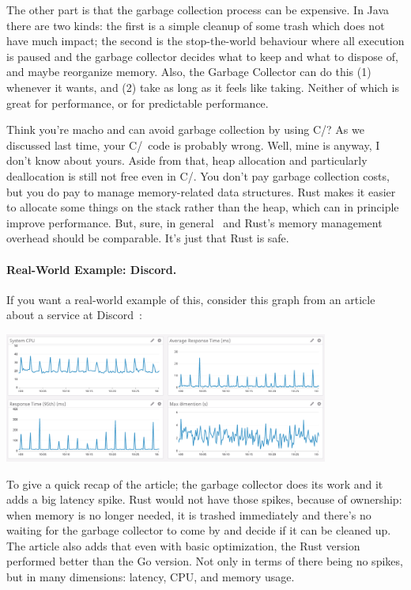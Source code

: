 The other part is that the garbage collection process can be expensive. In Java there are two kinds: the first is a simple cleanup of some trash which does not have much impact; the second is the stop-the-world behaviour where all execution is paused and the garbage collector decides what to keep and what to dispose of, and maybe reorganize memory.  Also, the Garbage Collector can do this (1) whenever it wants, and (2) take as long as it feels like taking. Neither of which is great for performance, or for predictable performance.

Think you're macho and can avoid garbage collection by using C/\CPP? As we discussed last time, your C/\CPP~code is probably wrong. Well, mine is anyway, I don't know about yours. Aside from that, heap allocation and particularly deallocation is still not free even in C/\CPP. You don't pay garbage collection costs, but you do pay to manage memory-related data structures. Rust makes it easier to allocate some things on the stack rather than the heap, which can in principle improve performance. But, sure, in general \CPP~and Rust's memory management overhead should be comparable. It's just that Rust is safe.

\paragraph{Real-World Example: Discord.} If you want a real-world example of this, consider this graph from an article about a service at Discord~\cite{discord}:

\begin{center}
\includegraphics[width=0.8\textwidth]{images/golang-gc.png}
\end{center}

To give a quick recap of the article; the garbage collector does its work and it adds a big latency spike. Rust would not have those spikes, because of ownership: when memory is no longer needed, it is trashed immediately and there's no waiting for the garbage collector to come by and decide if it can be cleaned up. The article also adds that even with basic optimization, the Rust version performed better than the Go version. Not only in terms of there being no spikes, but in many dimensions: latency, CPU, and memory usage.

